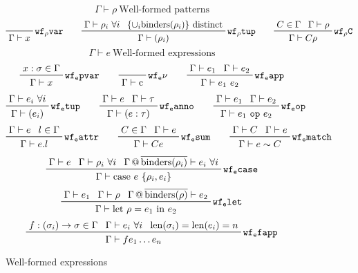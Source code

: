 \documentclass[letterpaper]{article}
\begin{document}
\begin{figure}
  $$ \boxed{\Gamma\vdash \rho}\ \textrm{Well-formed patterns} $$
  $$ \prfbyaxiom{$\mathtt{wf_\rho var}$}
             {\Gamma\vdash x}\qquad
     \prftree[r]{$\mathtt{wf_\rho tup}$}
             {\prfassumption{\Gamma\vdash\rho_i\ \forall i}}
             {\prfassumption{\{\cup_i\mathrm{binders}(\rho_i)\}\textrm{ distinct}}}
             {\Gamma\vdash (\rho_i)}\qquad
     \prftree[r]{$\mathtt{wf_\rho C}$}
             {\prfassumption{C\in\Gamma}}{\prfassumption{\Gamma\vdash\rho}}
             {\Gamma\vdash C\rho} $$
  $$ \boxed{\Gamma\vdash e}\ \textrm{Well-formed expressions} $$
  $$ \prftree[r]{$\mathtt{wf_e pvar}$}
             {\prfassumption{x:\sigma\in\Gamma}}
             {\Gamma\vdash x}\qquad
     \prfbyaxiom{$\mathtt{wf_e \nu}$}
             {\Gamma\vdash \textrm{c}}\qquad
     \prftree[r]{$\mathtt{wf_e app}$}
             {\prfassumption{\Gamma\vdash e_1}}{\prfassumption{\Gamma\vdash e_2}}
             {\Gamma\vdash e_1\ e_2} $$
  $$ \prftree[r]{$\mathtt{wf_e tup}$}
             {\prfassumption{\Gamma\vdash e_i\ \forall i}}
             {\Gamma\vdash (e_i)}\qquad
     \prftree[r]{$\mathtt{wf_e anno}$}
             {\prfassumption{\Gamma\vdash e}}{\prfassumption{\Gamma\vdash\tau}}
             {\Gamma\vdash (e : \tau)}\qquad
     \prftree[r]{$\mathtt{wf_e op}$}
             {\prfassumption{\Gamma\vdash e_1}}{\prfassumption{\Gamma\vdash e_2}}
             {\Gamma\vdash e_1\ \texttt{op}\ e_2} $$
  $$ \prftree[r]{$\mathtt{wf_e attr}$}
             {\prfassumption{\Gamma\vdash e}}{\prfassumption{l\in\Gamma}}
             {\Gamma\vdash e.l}\qquad
     \prftree[r]{$\mathtt{wf_e sum}$}
             {\prfassumption{C\in\Gamma}}{\prfassumption{\Gamma\vdash e}}
             {\Gamma\vdash C e}\qquad
     \prftree[r]{$\mathtt{wf_e match}$}
             {\prfassumption{\Gamma\vdash C}}{\prfassumption{\Gamma\vdash e}}
             {\Gamma\vdash e \sim C} $$
  $$ \prftree[r]{$\mathtt{wf_e case}$}
             {\prfassumption{\Gamma\vdash e}}{\prfassumption{\Gamma\vdash\rho_i\ \forall i}}
             {\prfassumption{\Gamma\,@\,\overline{\mathrm{binders}(\rho_i)}\vdash e_i\ \forall i}}
             {\Gamma\vdash\textrm{case}\ e\ \{\rho_i, e_i\}} $$
  $$ \prftree[r]{$\mathtt{wf_e let}$}
             {\prfassumption{\Gamma\vdash e_1}}{\prfassumption{\Gamma\vdash\rho}}
             {\prfassumption{\Gamma\,@\,\overline{\mathrm{binders}(\rho)}\vdash e_2}}
             {\Gamma\vdash\textrm{let}\ \rho=e_1\ \textrm{in}\ e_2} $$
  $$ \prftree[r]{$\mathtt{wf_e fapp}$}
             {\prfassumption{f:(\sigma_i)\rightarrow\sigma\in\Gamma}}
             {\prfassumption{\Gamma\vdash e_i\ \forall i}}
             {\prfassumption{\mathrm{len}(\sigma_i) = \mathrm{len}(e_i)} = n}
             {\Gamma\vdash f e_1 \ldots e_n} $$
  \caption{Well-formed expressions}
  \label{f:wf:expressions}
\end{figure}
\end{document}

